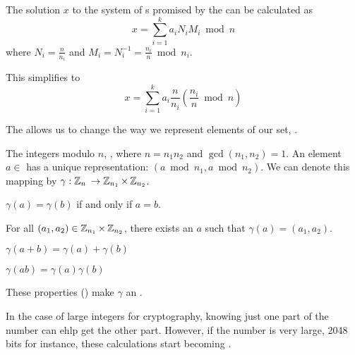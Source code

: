 \begin{definition}\label{def:Gauss_Algorithm}
  The solution $x$ to the system of s promised by the  can be calculated as
  \begin{equation}\label{eq:Gauss_Algorithm}
    x = \sum\limits_{i=1}^{k}a_{i} N_{i} M_{i} \bmod n
  \end{equation}
  where $N_{i} = \frac{n}{n_{i}}$ and $M_{i} = N_{i}^{-1} = \frac{n_{i}}{n} \bmod n_{i}$.
  
  This simplifies to
  \begin{equation}\label{eq:Gauss_Algorithm_Simplified}
    x = \sum\limits_{i=1}^{k}a_{i} \frac{n}{n_{i}} \left( \frac{n_{i}}{n} \bmod n \right)
  \end{equation}
\end{definition}

\begin{definition}\label{def:Chinese_Remainder_Theorem}
  The \emph{} allows us to change the way we represent elements of our set, \TextIntsModN{}.
  
  The integers modulo $n$, \TextIntsModN{}, where $n = n_{1}n_{2}$ and $\gcd(n_{1}, n_{2}) = 1$.
  An element $a \in$ \TextIntsModN{} has a unique representation: $(a \bmod n_{1}, a \bmod n_{2})$.
  We can denote this mapping by $\gamma : \operatorname{\mathbb{Z}}_{n}{} \rightarrow \operatorname{\mathbb{Z}}_{n_{1}} \times \operatorname{\mathbb{Z}}_{n_{2}}$.
  \begin{propertylist}
  \item $\gamma(a) = \gamma(b)$ if and only if $a = b$. \label{prop:Chinese_Remainder_Theorem_Property-Equivalence}
  \item For all $(a_{1}, a_{2}) \in \operatorname{\mathbb{Z}}_{n_{1}} \times \operatorname{\mathbb{Z}}_{n_{2}}$, there exists an $a$ such that $\gamma(a) = (a_{1}, a_{2})$.
  \item $\gamma(a+b) = \gamma(a) + \gamma(b)$
  \item $\gamma(ab) = \gamma(a) \gamma(b)$ \label{prop:Chinese_Remainder_Theorem_Property-Multiplication}
  \end{propertylist}
  These properties () make $\gamma$ an \emph{}.

  \begin{remark}
    In the case of large integers for cryptography, knowing just one part of the number can ehlp get the other part.
    However, if the number is very large, 2048 bits for instance, these calculations start becoming .
  \end{remark}
\end{definition}

